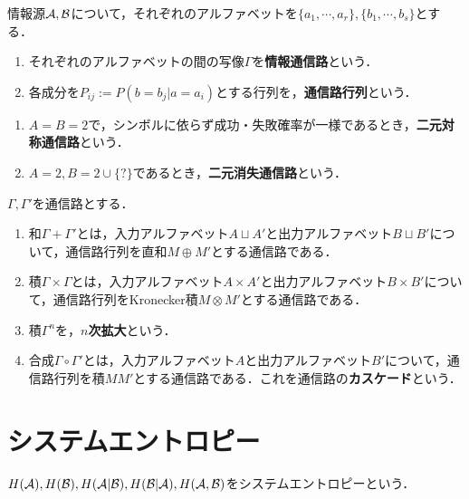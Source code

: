 \documentclass[uplatex,dvipdfmx]{jsreport}
\begin{document}
\begin{definition}[channel]
    情報源$\mathcal{A},\mathcal{B}$について，それぞれのアルファベットを$\{a_1,\cdots,a_r\},\{b_1,\cdots,b_s\}$とする．
    \begin{enumerate}
        \item それぞれのアルファベットの間の写像$\Gamma$を\textbf{情報通信路}という．
        \item 各成分を$P_{ij}:=P(b=b_j|a=a_i)$とする行列を，\textbf{通信路行列}という．
    \end{enumerate}
\end{definition}
\begin{example}\mbox{}
    \begin{enumerate}
        \item $A=B=2$で，シンボルに依らず成功・失敗確率が一様であるとき，\textbf{二元対称通信路}という．
        \item $A=2,B=2\cup\{?\}$であるとき，\textbf{二元消失通信路}という．
    \end{enumerate}
\end{example}

\begin{definition}
    $\Gamma,\Gamma'$を通信路とする．
    \begin{enumerate}
        \item 和$\Gamma+\Gamma'$とは，入力アルファベット$A\sqcup A'$と出力アルファベット$B\sqcup B'$について，通信路行列を直和$M\oplus M'$とする通信路である．
        \item 積$\Gamma\times\Gamma$とは，入力アルファベット$A\times A'$と出力アルファベット$B\times B'$について，通信路行列をKronecker積$M\otimes M'$とする通信路である．
        \item 積$\Gamma^n$を，\textbf{$n$次拡大}という．
        \item 合成$\Gamma\circ\Gamma'$とは，入力アルファベット$A$と出力アルファベット$B'$について，通信路行列を積$MM'$とする通信路である．これを通信路の\textbf{カスケード}という．
    \end{enumerate}
\end{definition}

\section{システムエントロピー}

\begin{tcolorbox}[colframe=ForestGreen, colback=ForestGreen!10!white,breakable,colbacktitle=ForestGreen!40!white,coltitle=black,fonttitle=\bfseries\sffamily,
title=]
    $H(\mathcal{A}),H(\mathcal{B}),H(\mathcal{A}|\mathcal{B}),H(\mathcal{B}|\mathcal{A}),H(\mathcal{A},\mathcal{B})$をシステムエントロピーという．
\end{tcolorbox}
\end{document}
